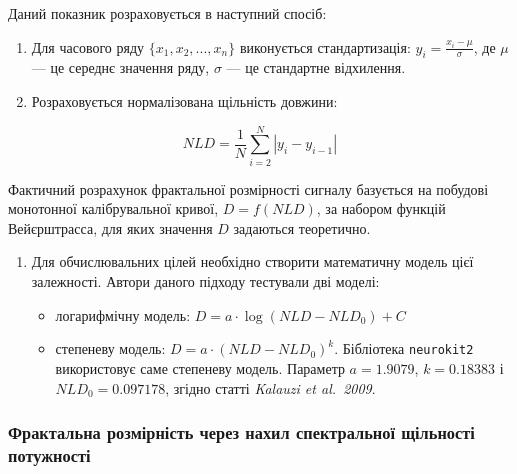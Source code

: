 \documentclass[
  letterpaper,
]{report}
\providecommand{\tightlist}{%
  \setlength{\itemsep}{0pt}\setlength{\parskip}{0pt}}\usepackage{longtable,booktabs,array}
\begin{document}
Даний показник розраховується в наступний спосіб:

\begin{enumerate}
\def\labelenumi{\arabic{enumi}.}
\tightlist
\item
  Для часового ряду \(\{ x_1, x_2,...,x_n \}\) виконується
  стандартизація: \(y_i = \frac{x_i - \mu}{\sigma}\), де \(\mu\) --- це
  середнє значення ряду, \(\sigma\) --- це стандартне відхилення.
\item
  Розраховується нормалізована щільність довжини:
\end{enumerate}

\[
NLD = \frac{1}{N}\sum_{i=2}^{N}\left| y_i - y_{i-1} \right|
\]

Фактичний розрахунок фрактальної розмірності сигналу базується на
побудові монотонної калібрувальної кривої, \(D = f(NLD)\), за набором
функцій Вейєрштрасса, для яких значення \(D\) задаються теоретично.

\begin{enumerate}
\def\labelenumi{\arabic{enumi}.}
\setcounter{enumi}{2}
\tightlist
\item
  Для обчислювальних цілей необхідно створити математичну модель цієї
  залежності. Автори даного підходу тестували дві моделі:

  \begin{itemize}
  \tightlist
  \item
    логарифмічну модель:
    \(D = a \cdot \log{\left(NLD - NLD_{0} \right)} + C\)
  \item
    степеневу модель: \(D = a \cdot \left(NLD - NLD_{0} \right)^{k}\).
    Бібліотека \texttt{neurokit2} використовує саме степеневу модель.
    Параметр \(a=1.9079\), \(k=0.18383\) і \(NLD_{0}=0.097178\), згідно
    статті \emph{Kalauzi et al.~2009}.
  \end{itemize}
\end{enumerate}

\hypertarget{ux444ux440ux430ux43aux442ux430ux43bux44cux43dux430-ux440ux43eux437ux43cux456ux440ux43dux456ux441ux442ux44c-ux447ux435ux440ux435ux437-ux43dux430ux445ux438ux43b-ux441ux43fux435ux43aux442ux440ux430ux43bux44cux43dux43eux457-ux449ux456ux43bux44cux43dux43eux441ux442ux456-ux43fux43eux442ux443ux436ux43dux43eux441ux442ux456}{%
\subsubsection{Фрактальна розмірність через нахил спектральної щільності
потужності}\label{ux444ux440ux430ux43aux442ux430ux43bux44cux43dux430-ux440ux43eux437ux43cux456ux440ux43dux456ux441ux442ux44c-ux447ux435ux440ux435ux437-ux43dux430ux445ux438ux43b-ux441ux43fux435ux43aux442ux440ux430ux43bux44cux43dux43eux457-ux449ux456ux43bux44cux43dux43eux441ux442ux456-ux43fux43eux442ux443ux436ux43dux43eux441ux442ux456}}
\end{document}
